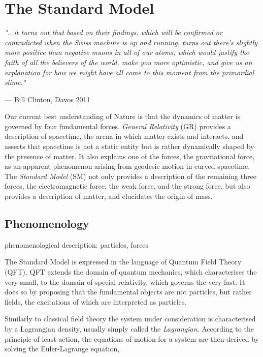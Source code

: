 \chapter{The Standard Model}

\textit{"...it turns out that based on their findings, which will be confirmed
or contradicted when the Swiss machine is up and running, turns out there's
slightly more positive than negative muons in all of our atoms, which would
justify the faith of all the believers of the world, make you more
optimistic, and give us an explanation for how we might have all come to this
moment from the primordial slime."}
\vspace{5mm}
\begin{flushright}
--- Bill Clinton, Davos 2011
\end{flushright}

\newpage
Our current best understanding of Nature is that the dynamics of matter is governed
by four fundamental forces. \textit{General Relativity} (GR) provides a
description of spacetime, the arena in which matter exists and interacts, and asserts
that spacetime is not a static entity but is rather dynamically shaped by the presence
of matter. It also explains one of the forces, the gravitational force, as an apparent
phenomenon arising from geodesic motion in curved spacetime. The \textit{Standard Model}
(SM) not only provides a description of the remaining three forces, the electromagnetic force,
the weak force, and the strong force, but also provides a description of matter, and 
elucidates the origin of mass.

\section{Phenomenology}

phenomenological description: particles, forces

The Standard Model is expressed in the language of Quantum Field Theory (QFT). QFT 
extends the domain of quantum mechanics, which characterises the very small, to
the domain of special relativity, which governs the very fast. It does so by
proposing that the fundamental objects are not particles, but rather fields, the
excitations of which are interpreted as particles.

Similarly to classical field theory the system under consideration is characterised
by a Lagrangian density, usually simply called the \textit{Lagrangian}. According to
the principle of least action, the equations of motion for a system are then derived
by solving the Euler-Lagrange equation,
\begin{equation}

\end{equation}

